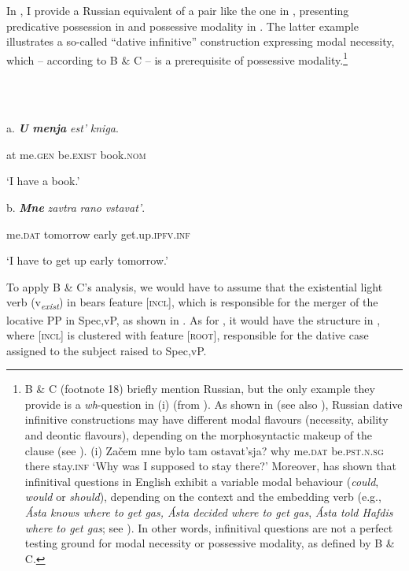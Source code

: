 \documentclass[output=paper,colorlinks,citecolor=brown]{./langscibook}
\begin{document}
In , I provide a Russian equivalent of a pair like the one in , presenting predicative possession in  and possessive modality in . The latter example illustrates a so-called “dative infinitive” construction expressing modal necessity, which – according to B \& C – is a prerequisite of possessive modality.\footnote{B \& C (footnote 18) briefly mention Russian, but the only example they provide is a \textit{wh}{}-question in (i) (from \citealt[105]{Jung2011}). As shown in \citet{Tsedryk2018} (see also \citealt{Fortuin2007}), Russian dative infinitive constructions may have different modal flavours (necessity, ability and deontic flavours), depending on the morphosyntactic makeup of the clause (see ).   (i)  Začem  mne       bylo          tam     ostavat’sja?    why     me.\textsc{dat}   be.\textsc{pst.n.sg}  there   stay.\textsc{inf}    ‘Why was I supposed to stay there?’      Moreover, \citet[ch. 4]{Bhatt2006} has shown that infinitival questions in English exhibit a variable modal behaviour (\textit{could}, \textit{would} or \textit{should}), depending on the context and the embedding verb (e.g., \textit{Ásta knows where to get gas, Ásta decided where to get gas}, \textit{Ásta told Hafdis where to get gas}; see \citealt[124]{Bhatt2006}). In other words, infinitival questions are not a perfect testing ground for modal necessity or possessive modality, as defined by B \& C.} 

\ea%
    \label{ex:tsedryk:6}
    \gll\\
        \\
    \glt
    \z

          a.  \textbf{\textit{U}  \textit{menja}}     \textit{est’}           \textit{kniga}.

    at  me.\textsc{gen}   be.\textsc{exist}    book.\textsc{nom}

    ‘I have a book.’

  b.   \textbf{\textit{Mne} }      \textit{zavtra}       \textit{rano}   \textit{vstavat’}.

    me.\textsc{dat}  tomorrow  early  get.up.\textsc{ipfv.inf}

  ‘I have to get up early tomorrow.’ \citep[ex. (20a)]{Tsedryk2018}  

To apply B \& C’s analysis, we would have to assume that the existential light verb (v\textit{\textsubscript{exist}}) in  bears feature [\textsc{incl}], which is responsible for the merger of the locative PP in Spec,vP, as shown in . As for , it would have the structure in , where [\textsc{incl}] is clustered with feature [\textsc{root}], responsible for the dative case assigned to the subject raised to Spec,vP.
\end{document}
